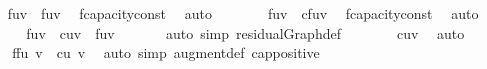 {\ \isamarkupfalse%
\ {\isachardoublequoteopen}{\isasymdots}\ {\isasymle}\ f{\isacharparenleft}u{\isacharcomma}v{\isacharparenright}\ {\isacharplus}\ f{\isacharprime}{\isacharparenleft}u{\isacharcomma}v{\isacharparenright}{\isachardoublequoteclose}\ \isamarkupfalse%
\ f{\isacharprime}{\isachardot}capacity{\isacharunderscore}const\ \isamarkupfalse%
\ auto\isanewline
\ \ \isamarkupfalse%
\ \isamarkupfalse%
\ {\isachardoublequoteopen}{\isasymdots}\ {\isasymle}\ f{\isacharparenleft}u{\isacharcomma}v{\isacharparenright}\ {\isacharplus}\ cf{\isacharparenleft}u{\isacharcomma}v{\isacharparenright}{\isachardoublequoteclose}\ \isamarkupfalse%
\ f{\isacharprime}{\isachardot}capacity{\isacharunderscore}const\ \isamarkupfalse%
\ auto\isanewline
\ \ \isamarkupfalse%
\ \isamarkupfalse%
\ {\isachardoublequoteopen}{\isasymdots}\ {\isacharequal}\ f{\isacharparenleft}u{\isacharcomma}v{\isacharparenright}\ {\isacharplus}\ c{\isacharparenleft}u{\isacharcomma}v{\isacharparenright}\ {\isacharminus}\ f{\isacharparenleft}u{\isacharcomma}v{\isacharparenright}{\isachardoublequoteclose}\ \isanewline
\ \ \ \ \isamarkupfalse%
\ {\isacharparenleft}auto\ simp{\isacharcolon}\ residualGraph{\isacharunderscore}def{\isacharparenright}\isanewline
\ \ \isamarkupfalse%
\ \isamarkupfalse%
\ {\isachardoublequoteopen}{\isasymdots}\ {\isacharequal}\ c{\isacharparenleft}u{\isacharcomma}v{\isacharparenright}{\isachardoublequoteclose}\ \isamarkupfalse%
\ auto\isanewline
\ \ \isamarkupfalse%
\ \isamarkupfalse%
\ {\isachardoublequoteopen}{\isacharparenleft}f{\isasymup}f{\isacharprime}{\isacharparenright}{\isacharparenleft}u{\isacharcomma}\ v{\isacharparenright}\ {\isasymle}\ c{\isacharparenleft}u{\isacharcomma}\ v{\isacharparenright}{\isachardoublequoteclose}\ \isacommand{{\isachardot}}\isamarkupfalse%
\isanewline
{}\isamarkupfalse%
\ {\isacharparenleft}auto\ simp{\isacharcolon}\ augment{\isacharunderscore}def\ cap{\isacharunderscore}positive{\isacharparenright}%
\endisatagproof
{\isafoldproof}%
%
\isadelimproof
%
\endisadelimproof
%
}%
